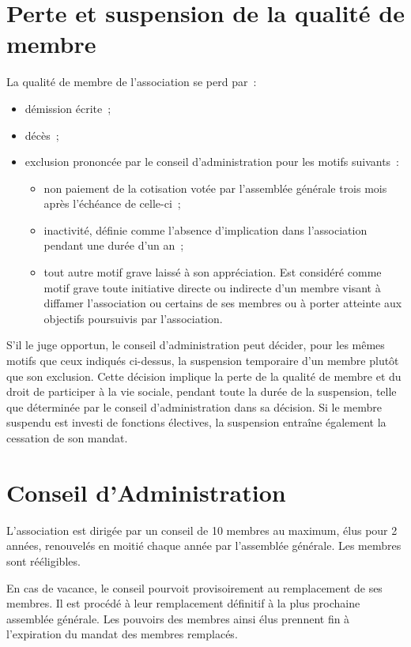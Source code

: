 \documentclass[12 pt]{article}
\begin{document}
\section{Perte et suspension de la qualité de membre}
\label{sec:perte-et-suspension-de-la-qualite-de-membre}

La qualité de membre de l'association se perd par :

\begin{itemize}
\item démission écrite~;
\item décès~;
\item exclusion prononcée par le conseil d'administration pour les
  motifs suivants~:
  \begin{itemize}
  \item non paiement de la cotisation votée par l'assemblée générale
    trois mois après l'échéance de celle-ci~;
  \item inactivité, définie comme l'absence d'implication dans
    l'association pendant une durée d'un an~;
  \item tout autre motif grave laissé à son appréciation. Est
    considéré comme motif grave toute initiative directe ou indirecte
    d'un membre visant à diffamer l'association ou certains de ses
    membres ou à porter atteinte aux objectifs poursuivis par
    l'association.
  \end{itemize}
\end{itemize}

S'il le juge opportun, le conseil d'administration peut décider, pour
les mêmes motifs que ceux indiqués ci-dessus, la suspension temporaire
d'un membre plutôt que son exclusion.  Cette décision implique la
perte de la qualité de membre et du droit de participer à la vie
sociale, pendant toute la durée de la suspension, telle que déterminée
par le conseil d'administration dans sa décision. Si le membre
suspendu est investi de fonctions électives, la suspension entraîne
également la cessation de son mandat.

\section{Conseil d'Administration}
\label{sec:administration}

L’association est dirigée par un conseil de 10 membres au maximum,
élus pour 2 années, renouvelés en moitié chaque année par l’assemblée
générale. Les membres sont rééligibles.

En cas de vacance, le conseil pourvoit provisoirement au remplacement
de ses membres. Il est procédé à leur remplacement définitif à la
plus prochaine assemblée générale. Les pouvoirs des membres ainsi élus
prennent fin à l’expiration du mandat des membres remplacés.
\end{document}
